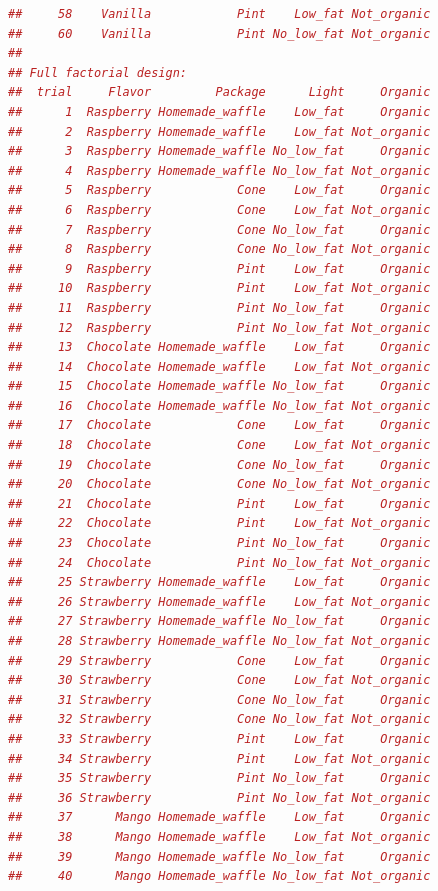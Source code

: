 \documentclass{article}
\begin{document}
\begin{lstlisting}[language=R]
##     58    Vanilla            Pint    Low_fat Not_organic
##     60    Vanilla            Pint No_low_fat Not_organic
## 
## Full factorial design:
##  trial     Flavor         Package      Light     Organic
##      1  Raspberry Homemade_waffle    Low_fat     Organic
##      2  Raspberry Homemade_waffle    Low_fat Not_organic
##      3  Raspberry Homemade_waffle No_low_fat     Organic
##      4  Raspberry Homemade_waffle No_low_fat Not_organic
##      5  Raspberry            Cone    Low_fat     Organic
##      6  Raspberry            Cone    Low_fat Not_organic
##      7  Raspberry            Cone No_low_fat     Organic
##      8  Raspberry            Cone No_low_fat Not_organic
##      9  Raspberry            Pint    Low_fat     Organic
##     10  Raspberry            Pint    Low_fat Not_organic
##     11  Raspberry            Pint No_low_fat     Organic
##     12  Raspberry            Pint No_low_fat Not_organic
##     13  Chocolate Homemade_waffle    Low_fat     Organic
##     14  Chocolate Homemade_waffle    Low_fat Not_organic
##     15  Chocolate Homemade_waffle No_low_fat     Organic
##     16  Chocolate Homemade_waffle No_low_fat Not_organic
##     17  Chocolate            Cone    Low_fat     Organic
##     18  Chocolate            Cone    Low_fat Not_organic
##     19  Chocolate            Cone No_low_fat     Organic
##     20  Chocolate            Cone No_low_fat Not_organic
##     21  Chocolate            Pint    Low_fat     Organic
##     22  Chocolate            Pint    Low_fat Not_organic
##     23  Chocolate            Pint No_low_fat     Organic
##     24  Chocolate            Pint No_low_fat Not_organic
##     25 Strawberry Homemade_waffle    Low_fat     Organic
##     26 Strawberry Homemade_waffle    Low_fat Not_organic
##     27 Strawberry Homemade_waffle No_low_fat     Organic
##     28 Strawberry Homemade_waffle No_low_fat Not_organic
##     29 Strawberry            Cone    Low_fat     Organic
##     30 Strawberry            Cone    Low_fat Not_organic
##     31 Strawberry            Cone No_low_fat     Organic
##     32 Strawberry            Cone No_low_fat Not_organic
##     33 Strawberry            Pint    Low_fat     Organic
##     34 Strawberry            Pint    Low_fat Not_organic
##     35 Strawberry            Pint No_low_fat     Organic
##     36 Strawberry            Pint No_low_fat Not_organic
##     37      Mango Homemade_waffle    Low_fat     Organic
##     38      Mango Homemade_waffle    Low_fat Not_organic
##     39      Mango Homemade_waffle No_low_fat     Organic
##     40      Mango Homemade_waffle No_low_fat Not_organic

\end{lstlisting}
\end{document}

